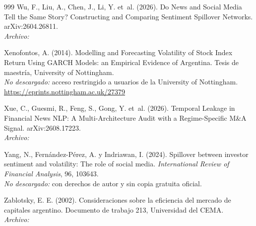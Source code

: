 \begin{thebibliography}{999}
Wu, F., Liu, A., Chen, J., Li, Y. et~al. (2026). Do News and Social Media Tell the Same Story? Constructing and Comparing Sentiment Spillover Networks. arXiv:2604.26811.
\\\textit{Archivo:} 

Xenofontos, A. (2014). Modelling and Forecasting Volatility of Stock Index Return Using GARCH Models: an Empirical Evidence of Argentina. Tesis de maestría, University of Nottingham.
\\\textit{No descargado:} acceso restringido a usuarios de la University of Nottingham. \url{https://eprints.nottingham.ac.uk/27379}

Xue, C., Guesmi, R., Feng, S., Gong, Y. et~al. (2026). Temporal Leakage in Financial News {NLP}: A Multi-Architecture Audit with a Regime-Specific {M\&A} Signal. arXiv:2608.17223.
\\\textit{Archivo:} 

Yang, N., Fern{\'a}ndez-P{\'e}rez, A. y Indriawan, I. (2024). Spillover between investor sentiment and volatility: The role of social media. \emph{International Review of Financial Analysis}, 96, 103643.
\\\textit{No descargado:} con derechos de autor y sin copia gratuita oficial.

Zablotsky, E. E. (2002). Consideraciones sobre la eficiencia del mercado de capitales argentino. Documento de trabajo 213, Universidad del CEMA.
\\\textit{Archivo:} 

\end{thebibliography}
